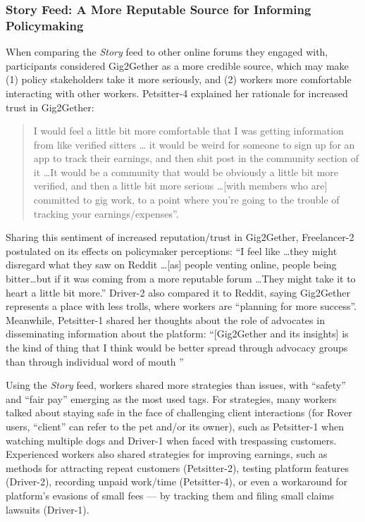 \subsubsection{{{Story Feed: A More Reputable Source for Informing Policymaking}}}
When comparing the \textit{Story} feed to other online forums they engaged with, participants considered Gig2Gether as a more credible source, which may make (1) policy stakeholders take it more seriously, and (2) workers more comfortable interacting with other workers. Petsitter-4 explained her rationale for increased trust in Gig2Gether: 
\begin{quote}
I would feel a little bit more comfortable that I was getting information from like verified sitters \dots
it would be weird for someone to sign up for an app to track their earnings, and then shit post in the community section of it \dots It would be a community that would be obviously a little bit more verified, and then a little bit more serious \dots [with members who are] committed to gig work, to a point where you're going to the trouble of tracking your earnings/expenses''.     
\end{quote}
Sharing this sentiment of increased reputation/trust in Gig2Gether, Freelancer-2 postulated on its effects on policymaker perceptions: ``I feel like \dots they might disregard what they saw on Reddit \dots [as] people venting online, people being bitter\dots but if it was coming from a more reputable forum \dots They might take it to heart a little bit more.'' Driver-2 also compared it to Reddit, saying Gig2Gether represents a place with less trolls, where workers are ``planning for more success''.
Meanwhile, Petsitter-1 shared her thoughts about the role of advocates in disseminating information about the platform: ``[Gig2Gether and its insights] is the kind of thing that I think would be better spread through advocacy groups than through individual word of mouth ''


{Using} the \textit{Story} feed, workers shared more strategies than issues, with ``safety'' and ``{fair pay}'' emerging as the most used tags. 
For strategies, many workers talked about staying safe in the face of challenging client interactions (for Rover users, ``client'' can refer to the pet and/or its owner), such as Petsitter-1 when watching multiple dogs and Driver-1 when faced with trespassing customers. 
Experienced workers also shared strategies for improving earnings, such as methods for attracting repeat customers (Petsitter-2), testing platform features (Driver-2), recording unpaid work/time (Petsitter-4), or even a workaround for platform's evasions of small fees --- by tracking them and filing small claims lawsuits (Driver-1). 

